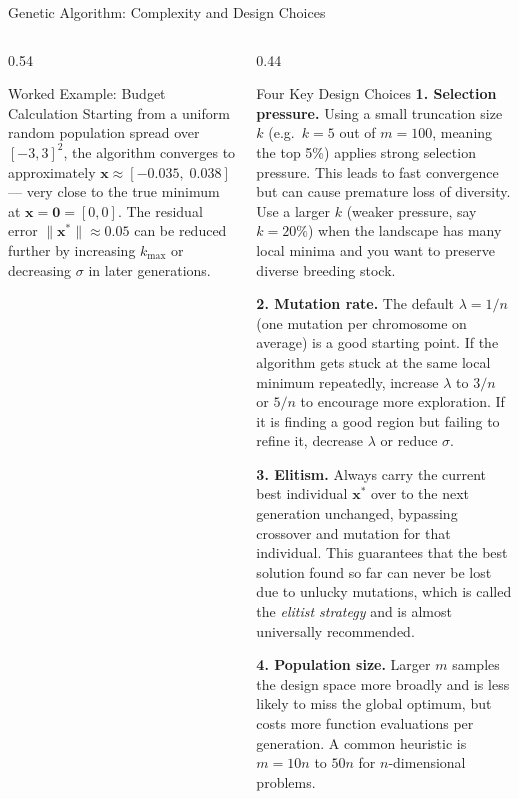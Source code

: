 \documentclass[aspectratio=169,10pt]{beamer}
\newcommand{\bx}{\mathbf{x}}
\begin{document}
\begin{frame}[allowframebreaks]{Genetic Algorithm: Complexity and Design Choices}
\begin{columns}[T]
\begin{column}{0.54\textwidth}
\begin{exampleblock}{Worked Example: Budget Calculation}
        Starting from a uniform random population spread over
        $[-3,3]^2$, the algorithm converges to approximately
        $\bx \approx [-0.035,\; 0.038]$ --- very close to the true
        minimum at $\bx = \mathbf{0} = [0, 0]$.  The residual error
        $\|\bx^*\| \approx 0.05$ can be reduced further by increasing
        $k_{\max}$ or decreasing $\sigma$ in later generations.
      \end{exampleblock}
    \end{column}
    \begin{column}{0.44\textwidth}
      \begin{block}{Four Key Design Choices}
        \textbf{1. Selection pressure.}
        Using a small truncation size $k$ (e.g.\ $k = 5$ out of
        $m = 100$, meaning the top 5\%) applies strong selection
        pressure.  This leads to fast convergence but can cause
        premature loss of diversity.  Use a larger $k$ (weaker
        pressure, say $k = 20\%$) when the landscape has many local
        minima and you want to preserve diverse breeding stock.

        \textbf{2. Mutation rate.}
        The default $\lambda = 1/n$ (one mutation per chromosome on
        average) is a good starting point.  If the algorithm gets
        stuck at the same local minimum repeatedly, increase $\lambda$
        to $3/n$ or $5/n$ to encourage more exploration.  If it is
        finding a good region but failing to refine it, decrease
        $\lambda$ or reduce $\sigma$.

        \textbf{3. Elitism.}
        Always carry the current best individual $\bx^*$ over to
        the next generation unchanged, bypassing crossover and
        mutation for that individual.  This guarantees that the
        best solution found so far can never be lost due to
        unlucky mutations, which is called the \emph{elitist
        strategy} and is almost universally recommended.

        \textbf{4. Population size.}
        Larger $m$ samples the design space more broadly and is
        less likely to miss the global optimum, but costs more
        function evaluations per generation.  A common heuristic
        is $m = 10n$ to $50n$ for $n$-dimensional problems.
      \end{block}
    \end{column}
  \end{columns}

\end{frame}
\end{document}
